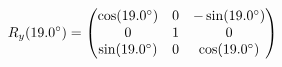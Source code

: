 \documentclass[preview]{standalone}
\begin{document}
\begin{align*}
\special{dvisvgm:raw <g id='unique000'>}R_y(19.0^\circ) = \begin{pmatrix} \cos(19.0^\circ) & 0 & -\sin(19.0^\circ) \\ 0 & 1 & 0 \\ \sin(19.0^\circ) & 0 & \cos(19.0^\circ) \end{pmatrix}\special{dvisvgm:raw </g>}
\end{align*}
\end{document}
